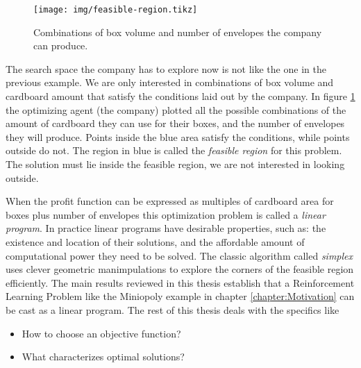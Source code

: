 \begin{figure}
   \centering
   \texttt{[image: img/feasible-region.tikz]} 
   \caption{Combinations of box volume and number of envelopes the company can produce.}
   \label{fig:feasible-region}
\end{figure}

The search space the company has to explore now is not like the one in the
previous example. We are only interested in combinations of box volume and
cardboard amount that satisfy the conditions laid out by the company. In figure
\ref{fig:feasible-region} the optimizing agent (the company) plotted all the
possible combinations of the amount of cardboard they can use for their boxes,
and the number of envelopes they will produce. Points inside the blue area
satisfy the conditions, while points outside do not. The region in blue is
called the \emph{feasible region} for this problem. The solution must lie inside
the feasible region, we are not interested in looking outside.

When the profit function can be expressed as multiples of cardboard area for
boxes plus number of envelopes this optimization problem is called a
\emph{linear program}. In practice linear programs have desirable properties,
such as: the existence and location of their solutions, and the affordable
amount of computational power they need to be solved. The classic algorithm
called \emph{simplex} uses clever geometric manimpulations to explore the
corners of the feasible region efficiently. The main results reviewed in this
thesis establish that a Reinforcement Learning Problem like the Miniopoly
example in chapter \ref{chapter:Motivation} can be cast as a linear program. The
rest of this thesis deals with the specifics like
\begin{itemize}
    \item How to choose an objective function?
    \item What characterizes optimal solutions?
\end{itemize}